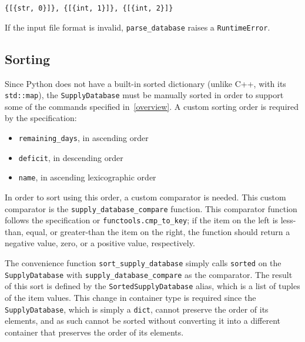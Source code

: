 \documentclass{article}
\begin{document}
			\begin{center}
				\verb|{[{str, 0}]}, {[{int, 1}]}, {[{int, 2}]}|
			\end{center}

			If the input file format is invalid, \verb|parse_database| raises a
			\verb|RuntimeError|.

		\subsection{Sorting}
			Since Python does not have a built-in sorted dictionary (unlike C++, with its
			\verb|std::map|), the \verb|SupplyDatabase| must be manually sorted in order to support
			some of the commands specified in~\ref{overview}. A custom sorting order is required by
			the specification:

			\begin{itemize}
				\item \verb|remaining_days|, in ascending order
				\item \verb|deficit|, in descending order
				\item \verb|name|, in ascending lexicographic order
			\end{itemize}

			In order to sort using this order, a custom comparator is needed. This custom
			comparator is the \verb|supply_database_compare| function. This comparator function
			follows the specification or \verb|functools.cmp_to_key|; if the item on the left is
			less-than, equal, or greater-than the item on the right, the function should return
			a negative value, zero, or a positive value, respectively.

			The convenience function \verb|sort_supply_database| simply calls \verb|sorted| on
			the \verb|SupplyDatabase| with \verb|supply_database_compare| as the comparator. The
			result of this sort is defined by the \verb|SortedSupplyDatabase| alias, which is a
			list of tuples of the item values. This change in container type is required since
			the \verb|SupplyDatabase|, which is simply a \verb|dict|, cannot preserve the order of
			its elements, and as such cannot be sorted without converting it into a different
			container that preserves the order of its elements.
\end{document}
